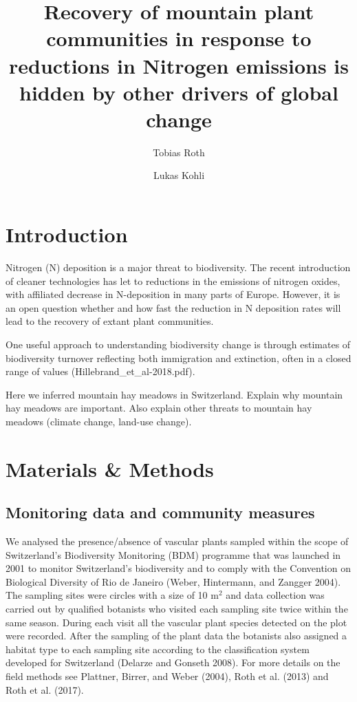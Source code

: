 \documentclass[fleqn,10pt,lineno]{wlpeerj} %
\title{Recovery of mountain plant communities in response to reductions in
Nitrogen emissions is hidden by other drivers of global change}
\author[1, 2]{Tobias Roth}
\author[2]{Lukas Kohli}
\affil[1]{Zoological Institute, University of Basel, Basel, Switzerland}
\affil[2]{Hintermann Weber AG, Austrasse 2a, 4153 Reinach, Switzerland}
\theoremstyle{definition}
\theoremstyle{definition}
\theoremstyle{definition}
\theoremstyle{remark}
\begin{document}
\flushbottom
\maketitle
\thispagestyle{empty}

\section*{Introduction}\label{introduction}

Nitrogen (N) deposition is a major threat to biodiversity. The recent
introduction of cleaner technologies has let to reductions in the
emissions of nitrogen oxides, with affiliated decrease in N-deposition
in many parts of Europe. However, it is an open question whether and how
fast the reduction in N deposition rates will lead to the recovery of
extant plant communities.

One useful approach to understanding biodiversity change is through
estimates of biodiversity turnover reflecting both immigration and
extinction, often in a closed range of values
(Hillebrand\_et\_al-2018.pdf).

Here we inferred mountain hay meadows in Switzerland. Explain why
mountain hay meadows are important. Also explain other threats to
mountain hay meadows (climate change, land-use change).

\section*{Materials \& Methods}\label{materials-methods}

\subsection*{Monitoring data and community
measures}\label{monitoring-data-and-community-measures}

We analysed the presence/absence of vascular plants sampled within the
scope of Switzerland's Biodiversity Monitoring (BDM) programme that was
launched in 2001 to monitor Switzerland's biodiversity and to comply
with the Convention on Biological Diversity of Rio de Janeiro (Weber,
Hintermann, and Zangger 2004). The sampling sites were circles with a
size of 10 m\(^2\) and data collection was carried out by qualified
botanists who visited each sampling site twice within the same season.
During each visit all the vascular plant species detected on the plot
were recorded. After the sampling of the plant data the botanists also
assigned a habitat type to each sampling site according to the
classification system developed for Switzerland (Delarze and Gonseth
2008). For more details on the field methods see Plattner, Birrer, and
Weber (2004), Roth et al. (2013) and Roth et al. (2017).
\end{document}
